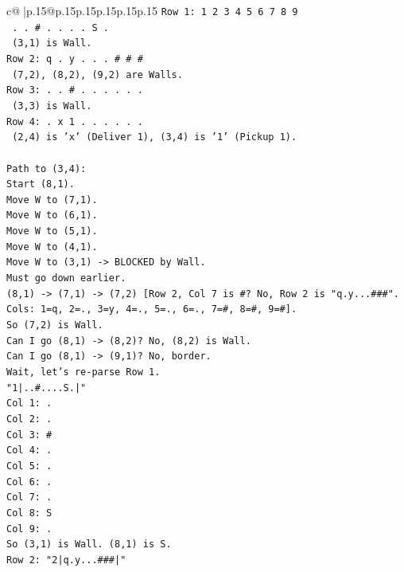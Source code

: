 \documentclass{article}
\begin{document}
{\begin{supertabular}{c@{$\;$}|p{.15\linewidth}@{}p{.15\linewidth}p{.15\linewidth}p{.15\linewidth}p{.15\linewidth}p{.15\linewidth}}
{{{\texttt{Row 1: 1 2 3 4 5 6 7 8 9} \\
\texttt{       . . \# . . . . S .} \\
\texttt{       (3,1) is Wall.} \\
\texttt{Row 2: q . y . . . \# \# \#} \\
\texttt{       (7,2), (8,2), (9,2) are Walls.} \\
\texttt{Row 3: . . \# . . . . . .} \\
\texttt{       (3,3) is Wall.} \\
\texttt{Row 4: . x 1 . . . . . .} \\
\texttt{       (2,4) is 'x' (Deliver 1), (3,4) is '1' (Pickup 1).} \\
\\ 
\texttt{Path to (3,4):} \\
\texttt{Start (8,1).} \\
\texttt{Move W to (7,1).} \\
\texttt{Move W to (6,1).} \\
\texttt{Move W to (5,1).} \\
\texttt{Move W to (4,1).} \\
\texttt{Move W to (3,1) {-}> BLOCKED by Wall.} \\
\texttt{Must go down earlier.} \\
\texttt{(8,1) {-}> (7,1) {-}> (7,2) {[}Row 2, Col 7 is \#? No, Row 2 is "q.y...\#\#\#". Cols: 1=q, 2=., 3=y, 4=., 5=., 6=., 7=\#, 8=\#, 9=\#{]}.} \\
\texttt{So (7,2) is Wall.} \\
\texttt{Can I go (8,1) {-}> (8,2)? No, (8,2) is Wall.} \\
\texttt{Can I go (8,1) {-}> (9,1)? No, border.} \\
\texttt{Wait, let's re{-}parse Row 1.} \\
\texttt{"1|..\#....S.|"} \\
\texttt{Col 1: .} \\
\texttt{Col 2: .} \\
\texttt{Col 3: \#} \\
\texttt{Col 4: .} \\
\texttt{Col 5: .} \\
\texttt{Col 6: .} \\
\texttt{Col 7: .} \\
\texttt{Col 8: S} \\
\texttt{Col 9: .} \\
\texttt{So (3,1) is Wall. (8,1) is S.} \\
\texttt{Row 2: "2|q.y...\#\#\#|"} \\
}}}
\end{supertabular}}
\end{document}

